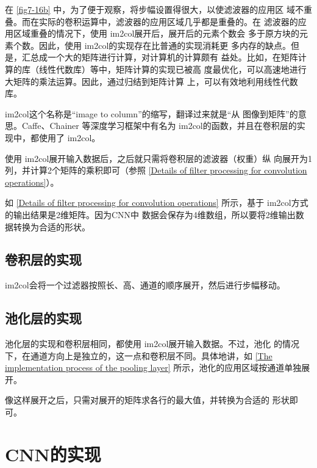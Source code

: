 在 \autoref{fig7-16b} 中，为了便于观察，将步幅设置得很大，以使滤波器的应用区
域不重叠。而在实际的卷积运算中，滤波器的应用区域几乎都是重叠的。在
滤波器的应用区域重叠的情况下，使用 im2col展开后，展开后的元素个数会
多于原方块的元素个数。因此，使用 im2col的实现存在比普通的实现消耗更
多内存的缺点。但是，汇总成一个大的矩阵进行计算，对计算机的计算颇有
益处。比如，在矩阵计算的库（线性代数库）等中，矩阵计算的实现已被高
度最优化，可以高速地进行大矩阵的乘法运算。因此，通过归结到矩阵计算
上，可以有效地利用线性代数库。

\begin{tcolorbox}
    im2col这个名称是“image to column”的缩写，翻译过来就是“从
    图像到矩阵”的意思。Caffe、Chainer 等深度学习框架中有名为
    im2col的函数，并且在卷积层的实现中，都使用了 im2col。
\end{tcolorbox}

使用 im2col展开输入数据后，之后就只需将卷积层的滤波器（权重）纵
向展开为1列，并计算2个矩阵的乘积即可（参照 \autoref{Details of filter processing for convolution operations}）。

如 \autoref{Details of filter processing for convolution operations} 所示，基于 im2col方式的输出结果是2维矩阵。因为CNN中
数据会保存为4维数组，所以要将2维输出数据转换为合适的形状。


\subsection{卷积层的实现}

im2col会将一个过滤器按照长、高、通道的顺序展开，然后进行步幅移动。

\subsection{池化层的实现}

池化层的实现和卷积层相同，都使用 im2col展开输入数据。不过，池化
的情况下，在通道方向上是独立的，这一点和卷积层不同。具体地讲，如 \autoref{The implementation process of the pooling layer} 所示，池化的应用区域按通道单独展开。


像这样展开之后，只需对展开的矩阵求各行的最大值，并转换为合适的
形状即可。

\section{CNN的实现}

